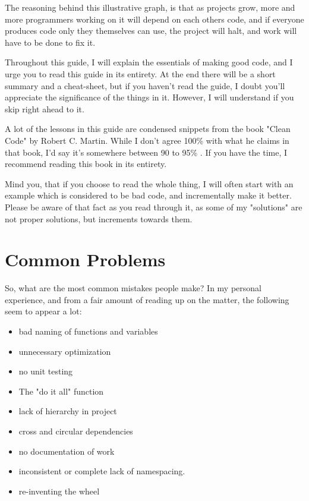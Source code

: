 \documentclass[10pt,a4paper]{article}
\begin{document}
The reasoning behind this illustrative graph, is that as projects grow, more and more programmers working on it will depend on each others code, and if everyone produces code only they themselves can use, the project will halt, and work will have to be done to fix it. 

Throughout this guide, I will explain the essentials of making good code, and I urge you to read this guide in its entirety. At the end there will be a short summary and a cheat-sheet, but if you haven't read the guide, I doubt you'll appreciate the significance of the things in it. However, I will understand if you skip right ahead to it. 

A lot of the lessons in this guide are condensed snippets from the book "Clean Code" by Robert C. Martin. While I don't agree 100\% with what he claims in that book, I'd say it's somewhere between 90 to 95\% . If you have the time, I recommend reading this book in its entirety. 

Mind you, that if you choose to read the whole thing, I will often start with an example which is considered to be bad code, and incrementally make it better. Please be aware of that fact as you read through it, as some of my "solutions" are not proper solutions, but increments towards them. 

\newpage
\section{Common Problems}

So, what are the most common mistakes people make? In my personal experience, and from a fair amount of reading up on the matter, the following seem to appear a lot:

\begin{itemize}
\item bad naming of functions and variables
\item unnecessary optimization
\item no unit testing
\item The "do it all" function
\item lack of hierarchy in project
\item cross and circular dependencies
\item no documentation of work
\item inconsistent or complete lack of namespacing.
\item re-inventing the wheel
\end{itemize}
\end{document}
